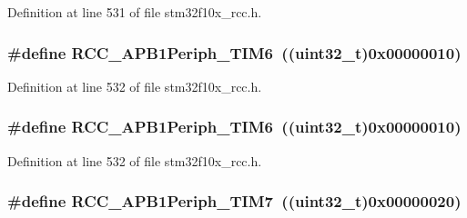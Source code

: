 Definition at line 531 of file stm32f10x\+\_\+rcc.\+h.

\subsubsection[{\texorpdfstring{R\+C\+C\+\_\+\+A\+P\+B1\+Periph\+\_\+\+T\+I\+M6}{RCC_APB1Periph_TIM6}}]{\setlength{\rightskip}{0pt plus 5cm}\#define R\+C\+C\+\_\+\+A\+P\+B1\+Periph\+\_\+\+T\+I\+M6~(({\bf uint32\+\_\+t})0x00000010)}\hypertarget{group___a_p_b1__peripheral_ga4974e8b8f11d54fbc0bac1988ff6254c}{}\label{group___a_p_b1__peripheral_ga4974e8b8f11d54fbc0bac1988ff6254c}


Definition at line 532 of file stm32f10x\+\_\+rcc.\+h.

\subsubsection[{\texorpdfstring{R\+C\+C\+\_\+\+A\+P\+B1\+Periph\+\_\+\+T\+I\+M6}{RCC_APB1Periph_TIM6}}]{\setlength{\rightskip}{0pt plus 5cm}\#define R\+C\+C\+\_\+\+A\+P\+B1\+Periph\+\_\+\+T\+I\+M6~(({\bf uint32\+\_\+t})0x00000010)}\hypertarget{group___a_p_b1__peripheral_ga4974e8b8f11d54fbc0bac1988ff6254c}{}\label{group___a_p_b1__peripheral_ga4974e8b8f11d54fbc0bac1988ff6254c}


Definition at line 532 of file stm32f10x\+\_\+rcc.\+h.

\subsubsection[{\texorpdfstring{R\+C\+C\+\_\+\+A\+P\+B1\+Periph\+\_\+\+T\+I\+M7}{RCC_APB1Periph_TIM7}}]{\setlength{\rightskip}{0pt plus 5cm}\#define R\+C\+C\+\_\+\+A\+P\+B1\+Periph\+\_\+\+T\+I\+M7~(({\bf uint32\+\_\+t})0x00000020)}\hypertarget{group___a_p_b1__peripheral_ga9415b0c46db5318bdee3f868c16b8d35}{}\label{group___a_p_b1__peripheral_ga9415b0c46db5318bdee3f868c16b8d35}


